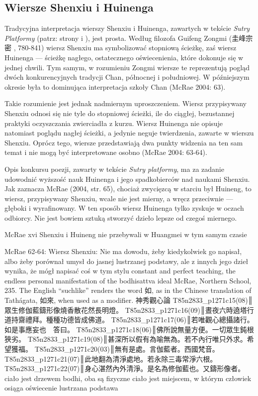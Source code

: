 \subsection{Wiersze Shenxiu i Huinenga}
Tradycyjna interpretacja wierszy Shenxiu i Huinenga, zawartych w tekście \textit{Sutry Platformy} (patrz: strony \pageref{ShenxiuVerse} i \pageref{HuinengVerse}), jest prosta.
Według filozofa Guifeng Zongmi (圭峰宗密 , 780-841) wiersz Shenxiu ma symbolizować stopniową ścieżkę, zaś wiersz Huinenga --- ścieżkę nagłego, ostatecznego oświecenienia, które dokonuje się w jednej chwili.
Tym samym, w rozumieniu Zongmi wiersze te reprezentują pogląd dwóch konkurencyjnych tradycji Chan, północnej i południowej.
W późniejszym okresie była to dominująca interpretacja szkoły Chan
(McRae 2004: 63).

Takie rozumienie jest jednak nadmiernym uproszczeniem. Wiersz przypisywany Shenxiu odnosi się nie tyle do stopniowej ścieżki, ile do ciągłej, bezustannej praktyki oczyszczania zwierciadła z kurzu.
Wiersz Huinenga nie opisuje natomiast poglądu nagłej ścieżki, a jedynie neguje twierdzenia, zawarte w wierszu Shenxiu.
Oprócz tego, wiersze przedstawiają dwa punkty widzenia na ten sam temat i nie mogą być interpretowane osobno
(McRae 2004: 63-64).

Opis konkursu poezji, zawarty w tekście \textit{Sutry platformy}, ma za zadanie udowodnić wyższość nauk Huinenga i jego spadkobierców nad naukami Shenxiu.
Jak zaznacza McRae (2004, str. 65), chociaż zwycięzcą w starciu był Huineng, to wiersz, przypisywany Shenxiu, wcale nie jest mierny, a wręcz przeciwnie --- głęboki i wyrafinowany.
W ten sposób wiersz Huinenga tylko zyskuje w oczach odbiorcy. Nie jest bowiem sztuką stworzyć dzieło lepsze od czegoś miernego.

McRae xvi
Shenxiu i Huineng nie przebywali w Huangmei w tym samym czasie

McRae 62-64:
Wiersz Shenxiu:
Nie ma dowodu, żeby kiedykolwiek go napisał, albo żeby porównał umysł do jasnej lustrzanej podstawy, ale z innych jego dzieł wynika, że mógł napisać coś w tym stylu
constant and perfect teaching, the endless personal manifestation of the
bodhisattva ideal
McRae, Northern School, 235. The English “suchlike'' renders the word 如, as in the Chinese translation of Tathágata, 如來, when used as a modifier.
神秀觀心論
T85n2833_p1271c15(08)║眾生修伽藍鑄形像燒香散花然長明燈。
T85n2833_p1271c16(09)║晝夜六時遶塔行道持齋禮拜。種種功德皆成佛道。
T85n2833_p1271c17(06)║若唯觀心總攝諸行。如是事應妄也　答曰。
T85n2833_p1271c18(06)║佛所說無量方便。一切眾生鈍根狹劣。
T85n2833_p1271c19(08)║甚深所以假有為喻無為。若不內行唯只外求。希望獲福。
T85n2833_p1271c20(03)║無有是處。言伽藍者。西國梵音。
T85n2833_p1271c21(07)║此地翻為清淨處地。若永除三毒常淨六根。
T85n2833_p1271c22(07)║身心湛然內外清淨。是名為修伽藍也。又鑄形像者。
ciało jest drzewem bodhi, oba są fizyczne
ciało jest miejscem, w którym człowiek osiąga oświecenie
lustrzana podstawa

